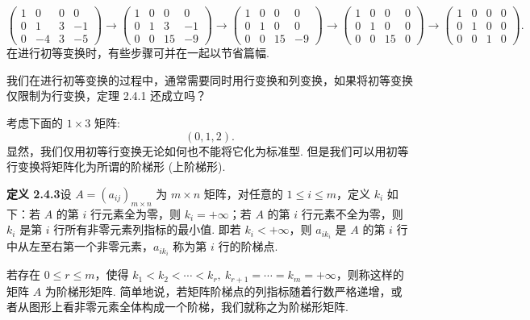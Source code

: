 \documentclass[UTF8, 12pt, fontset=fandol, oneside]{ctexart}
\begin{document}
\[
\left(\begin{array}{cccc}
1 & 0 & 0 & 0\\
0 & 1 & 3 & -1\\
0 & -4 & 3 & -5
\end{array}\right)
\longrightarrow
\left(\begin{array}{cccc}
1 & 0 & 0 & 0\\
0 & 1 & 3 & -1\\
0 & 0 & 15 & -9
\end{array}\right)
\longrightarrow
\left(\begin{array}{cccc}
1 & 0 & 0 & 0\\
0 & 1 & 0 & 0\\
0 & 0 & 15 & -9
\end{array}\right)
\longrightarrow
\left(\begin{array}{cccc}
1 & 0 & 0 & 0\\
0 & 1 & 0 & 0\\
0 & 0 & 15 & 0
\end{array}\right)
\longrightarrow
\left(\begin{array}{cccc}
1 & 0 & 0 & 0\\
0 & 1 & 0 & 0\\
0 & 0 & 1 & 0
\end{array}\right).
\]
在进行初等变换时，有些步骤可并在一起以节省篇幅.

我们在进行初等变换的过程中，通常需要同时用行变换和列变换，如果将初等变换仅限制为行变换，定理 2.4.1 还成立吗？

考虑下面的 $1\times 3$ 矩阵:
\[
(0,1,2).
\]
显然，我们仅用初等行变换无论如何也不能将它化为标准型. 但是我们可以用初等行变换将矩阵化为所谓的阶梯形 (上阶梯形).

\noindent\textbf{定义 2.4.3}\quad 设 $A=(a_{ij})_{m\times n}$ 为 $m\times n$ 矩阵，对任意的 $1\le i\le m$，定义 $k_i$ 如下：若 $A$ 的第 $i$ 行元素全为零，则 $k_i=+\infty$；若 $A$ 的第 $i$ 行元素不全为零，则 $k_i$ 是第 $i$ 行所有非零元素列指标的最小值. 即若 $k_i<+\infty$，则 $a_{ik_i}$ 是 $A$ 的第 $i$ 行中从左至右第一个非零元素，$a_{ik_i}$ 称为第 $i$ 行的阶梯点.

若存在 $0\le r\le m$，使得 $k_1<k_2<\cdots<k_r,\ k_{r+1}=\cdots=k_m=+\infty$，则称这样的矩阵 $A$ 为阶梯形矩阵. 简单地说，若矩阵阶梯点的列指标随着行数严格递增，或者从图形上看非零元素全体构成一个阶梯，我们就称之为阶梯形矩阵.
\end{document}
